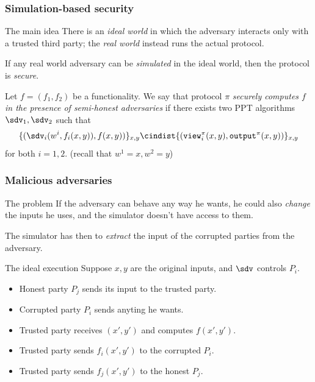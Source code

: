 \documentclass{beamer}
\begin{document}
    \begin{frame}
        \frametitle{Simulation-based security}
        
        \begin{block}{The main idea}
            There is an \emph{ideal world} in which the adversary interacts only with a trusted third party; the \emph{real world} instead runs the actual protocol.
            
            If any real world adversary can be \emph{simulated} in the ideal world, then the protocol is \emph{secure}.
        \end{block}
    
        \begin{definition}
            Let $f=(f_1,f_2)$ be a functionality. We say that protocol $\pi$ \emph{securely computes $f$ in the presence of semi-honest adversaries} if there exists two PPT algorithms $\sdv_1,\sdv_2$ such that
            $$ \{ (\sdv_i(w^i,f_i(x,y)), f(x,y) ) \}_{x,y} \cindist \{ (\texttt{view}_i^\pi(x,y), \texttt{output}^\pi(x,y)) \}_{x,y} $$
            for both $i=1,2$. (recall that $w^1=x,w^2=y$)
        \end{definition}
    \end{frame}

    \begin{frame}
        \frametitle{Malicious adversaries}
        
        \begin{alertblock}{The problem}
            If the adversary can behave any way he wants, he could also \emph{change} the inputs he uses, and the simulator doesn't have access to them.
            
            The simulator has then to \emph{extract} the input of the corrupted parties from the adversary.
        \end{alertblock}
    
        \pause
        \begin{block}{The ideal execution}
            Suppose $x,y$ are the original inputs, and $\sdv$ controls $P_i$.
            \begin{itemize}
                \item Honest party $P_j$ sends its input to the trusted party.
                \item Corrupted party $P_i$ sends anyting he wants.
                \item Trusted party receives $(x',y')$ and computes $f(x',y')$.
                \item Trusted party sends $f_i(x',y')$ to the corrupted $P_i$.
                \item Trusted party sends $f_j(x',y')$ to the honest $P_j$.
            \end{itemize}
        \end{block}
    
    \end{frame}
\end{document}

